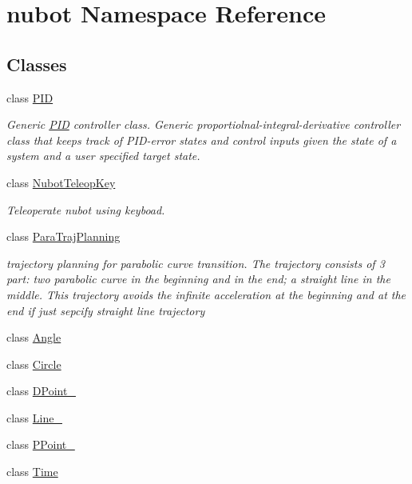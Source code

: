 \hypertarget{namespacenubot}{\section{nubot Namespace Reference}
\label{namespacenubot}
}
\subsection*{Classes}
\begin{DoxyCompactItemize}
\item 
class \hyperlink{classnubot_1_1PID}{P\-I\-D}
\begin{DoxyCompactList}\small\item\em Generic \hyperlink{classnubot_1_1PID}{P\-I\-D} controller class. Generic proportiolnal-\/integral-\/derivative controller class that keeps track of P\-I\-D-\/error states and control inputs given the state of a system and a user specified target state. \end{DoxyCompactList}\item 
class \hyperlink{classnubot_1_1NubotTeleopKey}{Nubot\-Teleop\-Key}
\begin{DoxyCompactList}\small\item\em Teleoperate nubot using keyboad. \end{DoxyCompactList}\item 
class \hyperlink{classnubot_1_1ParaTrajPlanning}{Para\-Traj\-Planning}
\begin{DoxyCompactList}\small\item\em trajectory planning for parabolic curve transition. The trajectory consists of 3 part\-: two parabolic curve in the beginning and in the end; a straight line in the middle. This trajectory avoids the infinite acceleration at the beginning and at the end if just sepcify straight line trajectory \end{DoxyCompactList}\item 
class \hyperlink{classnubot_1_1Angle}{Angle}
\item 
class \hyperlink{classnubot_1_1Circle}{Circle}
\item 
class \hyperlink{classnubot_1_1DPoint__}{D\-Point\-\_\-}
\item 
class \hyperlink{classnubot_1_1Line__}{Line\-\_\-}
\item 
class \hyperlink{classnubot_1_1PPoint__}{P\-Point\-\_\-}
\item 
class \hyperlink{classnubot_1_1Time}{Time}
\end{DoxyCompactItemize}
